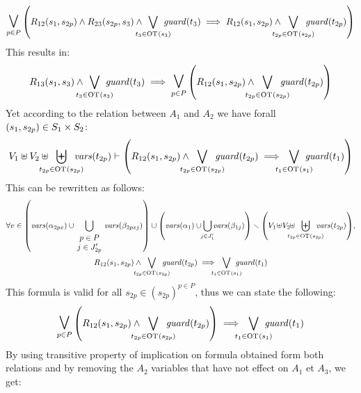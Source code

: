 \documentclass[runningheads]{llncs}
\begin{document}
\begin{enumerate}
\begin{align*}
\operatorname*{\bigsymb{\bigvee}}_{p\in P}\mpar{
R_{12}\mpar{s_1,s_{2p}}\wedge R_{23}\mpar{s_{2p}, s_3} \wedge \bigvee_\subbox{t_3 \in \fOT{s_3}} \fguard{t_3} \implies R_{12}\mpar{s_1,s_{2p}}\wedge \bigvee_\subbox{t_{2p} \in \fOT{s_{2p}}} \fguard{t_{2p}}} 
\end{align*}
This results in:
\begin{align*}
R_{13}\mpar{s_1,s_3} \wedge \bigvee_\subbox{t_3 \in \fOT{s_3}} \fguard{t_3} \implies \operatorname*{\bigsymb{\bigvee}}_{p\in P}\mpar{ R_{12}\mpar{s_1,s_{2p}}\wedge \bigvee_\subbox{t_{2p} \in \fOT{s_{2p}}} \fguard{t_{2p}}} 
\end{align*}
Yet according to the relation between $A_1$ and $A_2$ we have  forall ${\left(s_1, s_{2p}\right)} \in S_1 \times S_2$:
\begin{multline*}
 V_1 \uplus V_2 \uplus \biguplus_\subbox{t_{2p} \in \fOT{s_{2p}}} \fvars{t_{2p}} \vdash \left(R_{12}\mpar{s_1, s_{2p}} \wedge \bigvee_\subbox{t_{2p} \in \fOT{s_{2p}}} \fguard{t_{2p}} \implies \bigvee_\subbox{t_1 \in \fOT{s_1}} \fguard{t_1} \right)
\end{multline*}
This can be rewritten as follows: 
\begin{multline*}
\everymath{\displaystyle}
\forall v\in \mpar{\fvars{\alpha_{2px}}  \cup \!\! \bigcup_{\begin{array}{c} p\in P\\ j \in J'_{2p}
\end{array}} \!\! \fvars{\beta_{2pxj}}}\cup \mpar{\fvars{\alpha_{1}}  \cup\!\! \bigcup_{j \in J'_{1}} \!\!\fvars{\beta_{1j}}}
 \setminus \mpar{V_1\! \uplus\! V_2\!\! \uplus \biguplus_\subbox{t_{2p} \in \fOT{s_{2p}}} \fvars{t_{2p}}},\\
R_{12}\mpar{s_1, s_{2p}} \wedge \bigvee_\subbox{t_{2p} \in \fOT{s_{2p}}} \fguard{t_{2p}} \implies \bigvee_\subbox{t_1 \in \fOT{s_1}} \fguard{t_1}
\end{multline*}
This formula is valid for all $s_{2p} \in (s_{2p})^{p\in P}$,  thus we can state the following:
\begin{align*}
\operatorname*{\bigsymb{\bigvee}}_{p\in P}\mpar{R_{12}\mpar{s_1, s_{2p}} \wedge \bigvee_\subbox{t_{2p} \in \fOT{s_{2p}}} \fguard{t_{2p}} }  \implies \bigvee_\subbox{t_1 \in \fOT{s_1}} \fguard{t_1}
\end{align*}
By using transitive property of implication on formula obtained form both relations and by removing the $A_2$ variables that have not effect on   $A_1$ et  $A_3$, we get:
\begin{multline*}

\end{multline*}
\end{enumerate}
\end{document}
